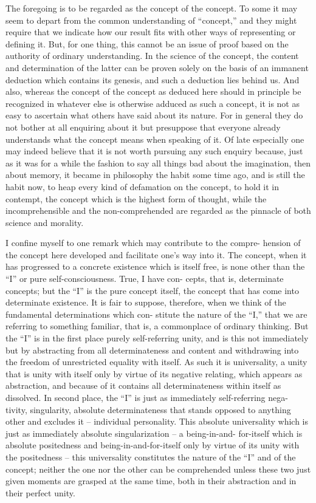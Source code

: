 The foregoing is to be regarded as
the concept of the concept.
To some it may seem to depart
from the common understanding of “concept,”
and they might require that we indicate
how our result fits with other ways
of representing or defining it.
But, for one thing, this cannot be an issue of proof
based on the authority of ordinary understanding.
In the science of the concept,
the content and determination of the latter
can be proven solely on the basis
of an immanent deduction which contains its genesis,
and such a deduction lies behind us.
And also, whereas the concept of the concept
as deduced here should in principle
be recognized in whatever else
is otherwise adduced as such a concept,
it is not as easy to ascertain what
others have said about its nature.
For in general they do not bother at all
enquiring about it but presuppose
that everyone already understands what
the concept means when speaking of it.
Of late especially one may indeed
believe that it is not worth pursuing
any such enquiry because, just as it was
for a while the fashion to say all things bad
about the imagination, then about memory,
it became in philosophy the habit some time ago,
and is still the habit now,
to heap every kind of defamation on the concept,
to hold it in contempt,
the concept which is the highest form of thought,
while the incomprehensible and the non-comprehended are
regarded as the pinnacle of both science and morality.

I confine myself to one remark which may contribute to the compre-
hension of the concept here developed and facilitate one's way into it. The
concept, when it has progressed to a concrete existence which is itself free,
is none other than the “I” or pure self-consciousness. True, I have con-
cepts, that is, determinate concepts; but the “I” is the pure concept itself,
the concept that has come into determinate existence. It is fair to suppose,
therefore, when we think of the fundamental determinations which con-
stitute the nature of the “I,” that we are referring to something familiar,
that is, a commonplace of ordinary thinking. But the “I” is in the first place
purely self-referring unity, and is this not immediately but by abstracting
from all determinateness and content and withdrawing into the freedom
of unrestricted equality with itself. As such it is universality, a unity that
is unity with itself only by virtue of its negative relating, which appears as
abstraction, and because of it contains all determinateness within itself as
dissolved. In second place, the “I” is just as immediately self-referring nega-
tivity, singularity, absolute determinateness that stands opposed to anything
other and excludes it – individual personality. This absolute universality
which is just as immediately absolute singularization – a being-in-and-
for-itself which is absolute positedness and being-in-and-for-itself only by
virtue of its unity with the positedness – this universality constitutes the
nature of the “I” and of the concept; neither the one nor the other can
be comprehended unless these two just given moments are grasped at the
same time, both in their abstraction and in their perfect unity.

